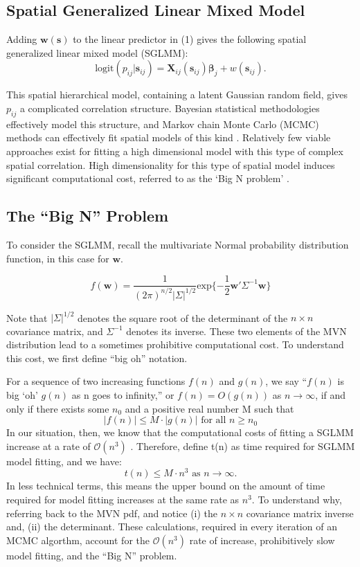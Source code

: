 \subsection{Spatial Generalized Linear Mixed Model}
Adding $\pmb{w}(\pmb{s})$ to the linear predictor in (1) gives the following spatial generalized linear mixed model (SGLMM):
\begin{equation}
\text{logit}(p_{ij}|\pmb{s}_{ij}) = \pmb{X}_{ij}(\pmb{s}_{ij}) \pmb{\beta}_{j} + w(\pmb{s}_{ij}).
\end{equation}

This spatial hierarchical model, containing a latent Gaussian random field, gives $p_{ij}$ a complicated correlation structure. Bayesian statistical methodologies effectively model this structure, and Markov chain Monte Carlo (MCMC) methods can effectively fit spatial models of this kind \citep{Banerjee2014}. Relatively few viable approaches exist for fitting a high dimensional model with this type of complex spatial correlation. High dimensionality for this type of spatial model induces significant computational cost, referred to as the `Big N problem' \citep{Lindgren2011}.

\subsection{The ``Big N'' Problem}

To consider the SGLMM, recall the multivariate Normal probability distribution function, in this case for $\pmb{w}$.

$$ f(\pmb{w}) = \frac{1}{(2\pi)^{n/2}|\Sigma|^{1/2}} \text{exp}\{ -\frac{1}{2}\pmb{w}'\Sigma^{-1}\pmb{w} \}$$

Note that $|\Sigma|^{1/2}$ denotes the square root of the determinant of the $n \times n$ covariance matrix, and $\Sigma^{-1}$ denotes its inverse. These two elements of the MVN distribution lead to a sometimes prohibitive computational cost. To understand this cost, we first define ``big oh'' notation. 

For a sequence of two increasing functions $f(n)$ and $g(n)$, we say ``$f(n)$ is big `oh' $g(n)$ as n goes to infinity,'' or $f(n) = O(g(n))$ as $n \rightarrow \infty$, if and only if there exists some $n_{0}$ and a positive real number M such that
  $$|f(n)| \leq M \cdot |g(n)| \text{ for all } n \geq n_0 $$
In our situation, then, we know that the computational costs of fitting a SGLMM increase at a rate of $\mathcal{O}(n^{3})$ \citep{Finley2009}. Therefore, define t(n) as time required for SGLMM model fitting, and we have:
$$t(n) \leq M \cdot n^{3} \text{ as } n \rightarrow \infty.$$
In less technical terms, this means the upper bound on the amount of time required for model fitting increases at the same rate as $n^{3}$. To understand why, referring back to the MVN pdf, and notice (i) the $n \times n$ covariance matrix inverse and, (ii) the determinant. These calculations, required in every iteration of an MCMC algorthm, account for the $\mathcal{O}(n^{3})$ rate of increase, prohibitively slow model fitting, and the ``Big N'' problem.

